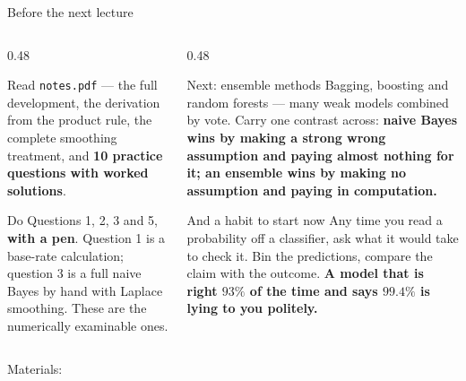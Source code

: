 \documentclass[aspectratio=169]{beamer}
\begin{document}
\begin{frame}[shrink=3]{Before the next lecture}
  \begin{columns}[T]
    \begin{column}{0.48\textwidth}
      \begin{block}{Read}
        \texttt{notes.pdf} --- the full development, the derivation from the
        product rule, the complete smoothing treatment, and \textbf{10
        practice questions with worked solutions}.
      \end{block}
      \begin{block}{Do}
        Questions 1, 2, 3 and 5, \textbf{with a pen}. Question 1 is a
        base-rate calculation; question 3 is a full naive Bayes by hand with
        Laplace smoothing. These are the numerically examinable ones.
      \end{block}
    \end{column}
    \begin{column}{0.48\textwidth}
      \begin{exampleblock}{Next: ensemble methods}
        Bagging, boosting and random forests --- many weak models combined by
        vote. Carry one contrast across: \textbf{naive Bayes wins by making a
        strong wrong assumption and paying almost nothing for it; an ensemble
        wins by making no assumption and paying in computation.}
      \end{exampleblock}
      \begin{alertblock}{And a habit to start now}
        Any time you read a probability off a classifier, ask what it would
        take to check it. Bin the predictions, compare the claim with the
        outcome. \textbf{A model that is right $93\%$ of the time and says
        $99.4\%$ is lying to you politely.}
      \end{alertblock}
    \end{column}
  \end{columns}
  \begin{center}
    \small Materials: \texttt{\AMLRepoURL}
  \end{center}
  \slidesources{\AMLUnitVISources}
\end{frame}
\end{document}
